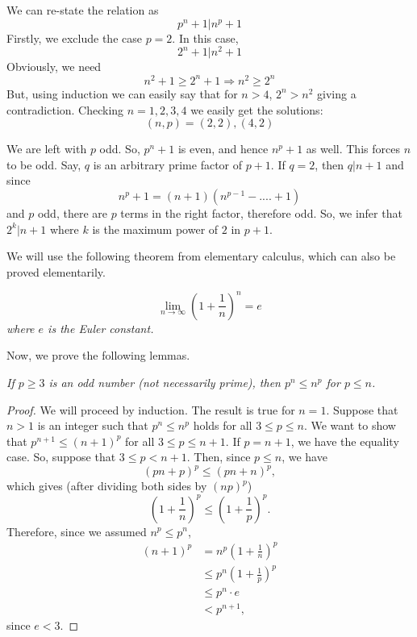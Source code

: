 \documentclass[problems.tex]{subfile}
\begin{document}
	\begin{solution}
		We can re-state the relation as \[p^n+1|n^p+1\]
		Firstly, we exclude the case $p=2$. In this case, \[2^n+1|n^2+1\]
		Obviously, we need \[n^2+1\ge2^n+1\Rightarrow n^2\ge2^n\]
		But, using induction we can easily say that for $n>4$, $2^n>n^2$ giving a contradiction. Checking $n=1,2,3,4$ we easily get the solutions: \[(n,p)=(2,2), (4,2)\]
		
		We are left with $p$ odd. So, $p^n+1$ is even, and hence $n^p+1$ as well. This forces $n$ to be odd. Say, $q$ is an arbitrary prime factor of $p+1$. If $q=2$, then $q|n+1$ and since \[n^p+1=(n+1)(n^{p-1}-....+1)\]
		and $p$ odd, there are $p$ terms in the right factor, therefore odd. So, we infer that $2^k|n+1$ where $k$ is the maximum power of $2$ in $p+1$.
		
		We will use the following theorem from elementary calculus, which can also be proved elementarily.
		
		\begin{theorem}\slshape
			\[\lim\limits_{n\to\infty}\left(1+\frac{1}{n}\right) ^ {n}=e\]
			where $e$ is the Euler constant.
		\end{theorem}
		
		Now, we prove the following lemmas.
		\begin{lemma}\slshape\label{lem:aditya-generalized}
			If $p \geq 3$ is an odd number (not necessarily prime), then $p^n\le n^p$ for $p\le n$.
		\end{lemma}
		
		\begin{proof}[Proof]
			We will proceed by induction. The result is true for $n=1$. Suppose that $n>1$ is an integer such that $p^n \leq n^p$ holds for all $3 \leq p \leq n$. We want to show that $p^{n+1} \leq (n+1)^p$ for all $3 \leq p \leq n+1$. If $p=n+1$, we have the equality case. So, suppose that $3 \leq p < n+1$. Then, since $p\le n$, we have \[(pn+p)^p\le (pn+n)^p,\] which gives (after dividing both sides by $(np)^p$) \[\left(1 + \frac{1}{n}\right)^p \leq  \left(1 + \frac{1}{p}\right)^p.\]  Therefore, since we assumed $n^p \leq p^n$, 
				\begin{align*}
					(n+1)^p & = n^p\left(1+\frac{1}{n}\right)^p\\
							&\leq p^n\left(1+\frac{1}{p}\right)^p\\
							& \le p^n\cdot e\\
							& < p^{n+1},
				\end{align*}
		since $e<3$. 
	\end{proof}
		

\end{solution}
\end{document}
